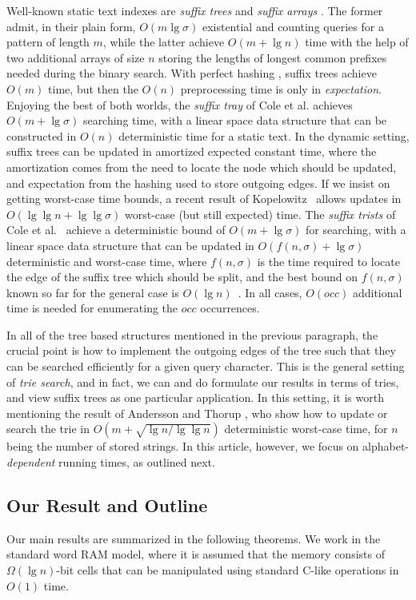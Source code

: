\documentclass[11pt,onecolumn,final]{article} \usepackage{a4}
\theoremstyle{plain}
\theoremstyle{remark}
\begin{document}
Well-known static text indexes are \emph{suffix trees} \cite{mccreight76space} and \emph{suffix arrays} \cite{manber93suffix}. The former admit, in their plain form, $O(m\lg\sigma)$ existential and counting queries for a pattern of length $m$, while the latter achieve $O(m+\lg n)$ time with the help of two additional arrays of size $n$ storing the lengths of longest common prefixes needed during the binary search. With perfect hashing \cite{fredman84storing}, suffix trees achieve $O(m)$ time, but then the $O(n)$ preprocessing time is only in \emph{expectation}. Enjoying the best of both worlds, the \emph{suffix tray} of Cole et al. \cite{cole06suffix} achieves $O(m+\lg \sigma)$ searching time, with a linear space data structure that can be constructed in $O(n)$ deterministic time for a static text. In the dynamic setting, suffix trees can be updated in amortized expected constant time, where the amortization comes from the need to locate the node which should be updated, and expectation from the hashing used to store outgoing edges. If we insist on getting worst-case time bounds, a recent result of Kopelowitz~\cite{Kopelot12indexing} allows updates in $O(\lg\lg n +\lg\lg\sigma)$ worst-case (but still expected) time. The \emph{suffix trists} of Cole et al.~\cite{cole06suffix} achieve a deterministic bound 
of $O(m+\lg\sigma)$ for searching, with a linear space data structure that can be updated in $O(f(n,\sigma)+\lg\sigma)$ deterministic and worst-case time, where $f(n,\sigma)$ is the time required to locate the edge of the suffix tree which should be split, and the best bound on $f(n,\sigma)$ known so far for the general case is $O(\lg n)$~\cite{Amir05towards}. In all cases, $O(occ)$ additional time is needed for enumerating the $occ$ occurrences.

In all of the tree based structures mentioned in the previous paragraph, the crucial point is how to implement the outgoing edges of the tree such that they can be searched efficiently for a given query character. This is the general setting of \emph{trie search}, and in fact, we can and do formulate our results in terms of tries, and view suffix trees as one particular application. In this setting, it is worth mentioning the result of Andersson and Thorup \cite{andersson07dynamic}, who show how to update or search the trie in $O(m+\sqrt{\lg n/\lg\lg n})$ deterministic worst-case time, for $n$ being the number of stored strings. In this article, however, we focus on alphabet-\emph{dependent} running times, as outlined next.

\subsection{Our Result and Outline}
Our main results are summarized in the following theorems. We work in the standard word RAM model, where it is assumed that the memory consists of $\Omega(\lg n)$-bit cells that can be manipulated using standard C-like operations in $O(1)$ time.
\end{document}
